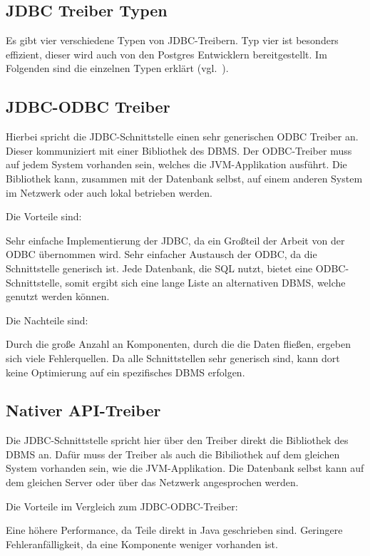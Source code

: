 \subsection{JDBC Treiber Typen}
Es gibt vier verschiedene Typen von JDBC-Treibern. Typ vier ist besonders
effizient, dieser wird auch von den Postgres Entwicklern bereitgestellt. Im
Folgenden sind die einzelnen Typen erklärt (vgl.~\cite{jdbc-types}).

\subsection{JDBC-ODBC Treiber}
Hierbei spricht die JDBC-Schnittstelle einen sehr generischen \gls{ODBC}
Treiber an. Dieser kommuniziert mit einer Bibliothek des DBMS\@. Der
ODBC-Treiber muss auf jedem System vorhanden sein, welches die JVM-Applikation
ausführt. Die Bibliothek kann, zusammen mit der Datenbank selbst, auf einem
anderen System im Netzwerk oder auch lokal betrieben werden.

Die Vorteile sind:

\begin{outline}
  \1 Sehr einfache Implementierung der JDBC, da ein Großteil der Arbeit von
  der ODBC übernommen wird.
  \1 Sehr einfacher Austausch der ODBC, da die Schnittstelle generisch ist.
  \1 Jede Datenbank, die SQL nutzt, bietet eine ODBC-Schnittstelle, somit
  ergibt sich eine lange Liste an alternativen DBMS, welche genutzt werden
  können.
\end{outline}

Die Nachteile sind:

\begin{outline}
  \1 Durch die große Anzahl an Komponenten, durch die die Daten fließen,
  ergeben sich viele Fehlerquellen.
  \1 Da alle Schnittstellen sehr generisch sind, kann dort keine Optimierung
  auf ein spezifisches DBMS erfolgen.
\end{outline}

\subsection{Nativer API-Treiber}
Die JDBC-Schnittstelle spricht hier über den Treiber direkt die Bibliothek
des DBMS an. Dafür muss der Treiber als auch die Bibiliothek auf dem gleichen
System vorhanden sein, wie die JVM-Applikation. Die Datenbank selbst kann auf
dem gleichen Server oder über das Netzwerk angesprochen werden.

Die Vorteile im Vergleich zum JDBC-ODBC-Treiber:
\begin{outline}
  \1 Eine höhere Performance, da Teile direkt in Java geschrieben sind.
  \1 Geringere Fehleranfälligkeit, da eine Komponente weniger vorhanden ist.
\end{outline}

